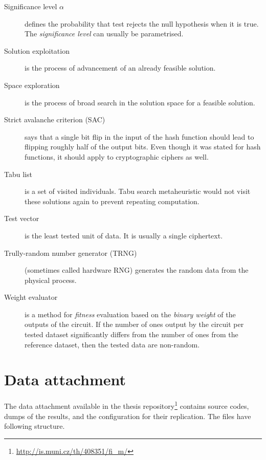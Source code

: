 \documentclass[
    digital,    %
    oneside,    %
    color,
    11pt,
    nocover,
    notable,
    nolof,
    nolot,
]{fithesis3}
\begin{document}
\begin{description}
    \item[Significance level $\alpha$] defines the probability that test rejects the null hypothesis when it is true. The \textit{significance level} can usually be parametrised.
    \item[Solution exploitation] is the process of advancement of an already feasible solution.
    \item[Space exploration] is the process of broad search in the solution space for a feasible solution.
    \item[Strict avalanche criterion (SAC)] says that a single bit flip in the input of the hash function should lead to flipping roughly half of the output bits. Even though it was stated for hash functions, it should apply to cryptographic ciphers as well.
    \item[Tabu list] is a set of visited individuals. Tabu search metaheuristic would not visit these solutions again to prevent repeating computation.
    \item[Test vector] is the least tested unit of data. It is usually a single ciphertext.
    \item[Trully-random number generator (TRNG)] (sometimes called hardware RNG) generates the random data from the physical process.
    \item[Weight evaluator] is a method for \textit{fitness} evaluation based on the \textit{binary weight} of the outputs of the circuit. If the number of ones output by the circuit per tested dataset significantly differs from the number of ones from the reference dataset, then the tested data are non-random.
\end{description}

\chapter{Data attachment}
\label{chap:app-data}

The data attachment available in the thesis repository\footnote{\url{http://is.muni.cz/th/408351/fi_m/}} contains source codes, dumps of the results, and the configuration for their replication. The files have following structure.
\end{document}
